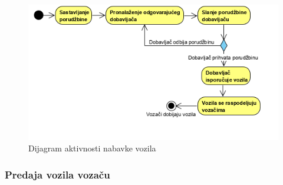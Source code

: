 \begin{figure}[H]
\begin{center}
\includegraphics[width=\textwidth]{Slike/NabavkaVozila.png}
\end{center}
    \caption{Dijagram aktivnosti nabavke vozila}
\label{fig:NabavkaVozila}
\end{figure}

\subsubsection{\bfseries Predaja vozila vozaču}

